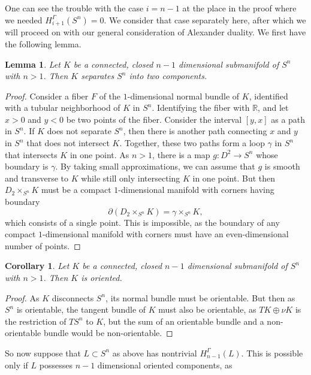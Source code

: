 \documentclass[12pt]{article}
\theoremstyle{plain}
\newtheorem{corollary}[theorem]{Corollary}
\newtheorem{lemma}[theorem]{Lemma}
\theoremstyle{definition}
\theoremstyle{remark}
\newcommand{\R}{\mathbb{R}}
\newcommand{\bd}{\partial}
\begin{document}
One can see the trouble with the case $i = n-1$ at the place in the proof where we needed $H_{i+1}^\Gamma (S^n) = 0$.
We consider that case separately here, after which we will proceed on with our general consideration of Alexander duality.
We first have the following lemma.

\begin{lemma}
Let $K$ be a connected, closed $n-1$ dimensional submanifold of $S^n$ with $n>1$.
Then $K$ separates $S^n$ into two components.
\end{lemma}
\begin{proof}
Consider a fiber $F$ of the $1$-dimensional normal bundle of $K$, identified with a tubular neighborhood of $K$ in $S^n$.
Identifying the fiber with $\R$, and let $x >0$ and $y < 0$ be two points of the fiber.
Consider the interval $[y,x]$ as a path in $S^n$.
If $K$ does not separate $S^n$, then there is another path connecting $x$ and $y$ in $S^n$ that does not intersect $K$.
Together, these two paths form a loop $\gamma$ in $S^n$ that intersects $K$ in one point.
As $n>1$, there is a map $g \colon D^2 \to S^n$ whose boundary is $\gamma$.
By taking small approximations, we can assume that $g$ is smooth and transverse to $K$ while still only intersecting $K$ in one point.
But then $D_2 \times_{S^n} K$ must be a compact $1$-dimensional manifold with corners having boundary $$\bd (D_2 \times_{S^n} K) = \gamma \times_{S^n} K,$$
which consists of a single point.
This is impossible, as the boundary of any compact $1$-dimensional manifold with corners must have an even-dimensional number of points.
\end{proof}

\begin{corollary}\label{C: codim 1 oriented}
Let $K$ be a connected, closed $n-1$ dimensional submanifold of $S^n$ with $n>1$.
Then $K$ is oriented.
\end{corollary}
\begin{proof}
As $K$ disconnects $S^n$, its normal bundle must be orientable.
But then as $S^n$ is orientable, the tangent bundle of $K$ must also be orientable, as $TK \oplus \nu K$ is the restriction of $TS^n$ to $K$, but the sum of an orientable bundle and a non-orientable bundle would be non-orientable.
\end{proof}



So now suppose that $L \subset S^n$ as above has nontrivial $H_{n-1}^\Gamma(L)$.
This is possible only if $L$ possesses $n-1$ dimensional oriented components, as
\end{document}
